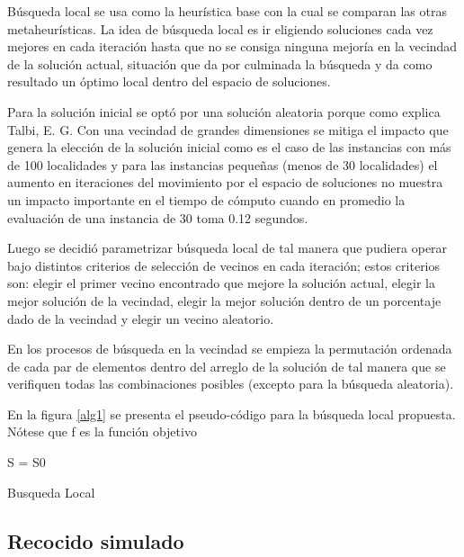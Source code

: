 \documentclass{ci5652}
\begin{document}
Búsqueda local se usa como la heurística base con la cual se comparan las otras metaheurísticas. La idea de búsqueda local es ir eligiendo soluciones cada vez mejores en cada iteración hasta que no se consiga ninguna mejoría en la vecindad de la solución actual, situación que da por culminada la búsqueda y da como resultado un óptimo local dentro del espacio de soluciones.

Para la solución inicial se optó por una solución aleatoria porque como explica Talbi, E. G. \cite{6} Con una vecindad de grandes dimensiones se mitiga el impacto que genera la elección de la solución inicial como es el caso de las instancias con más de 100 localidades y para las instancias pequeñas (menos de 30 localidades) el aumento en iteraciones del movimiento por el espacio de soluciones no muestra un impacto importante en el tiempo de cómputo cuando en promedio la evaluación de una instancia de 30 toma 0.12 segundos.

Luego se decidió parametrizar búsqueda local de tal manera que pudiera operar bajo distintos criterios de selección de vecinos en cada iteración; estos criterios son: elegir el primer vecino encontrado que mejore la solución actual, elegir la mejor solución de la vecindad, elegir la mejor solución dentro de un porcentaje dado de la vecindad y elegir un vecino aleatorio.

En los procesos de búsqueda en la vecindad se empieza la permutación ordenada de cada par de elementos dentro del arreglo de la solución de tal manera que se verifiquen todas las combinaciones posibles (excepto para la búsqueda aleatoria). 

En la figura \ref{alg1} se presenta el pseudo-código para la búsqueda local propuesta. Nótese que f es la función objetivo

\begin{algorithm}
 \label{alg1}
 \DontPrintSemicolon
 \vspace*{0.1cm}
 S = S0 
 \vspace*{0.1cm}
 \caption{Busqueda Local}
\end{algorithm}

\subsection{Recocido simulado}
 
\end{document}

